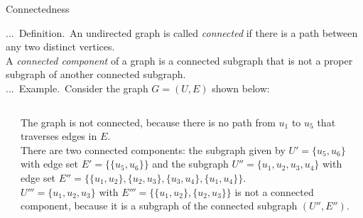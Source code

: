 \documentclass[smaller,hyperref={CJKbookmarks=true}]{beamer}
\newcounter{zhuo}[subsection]
\renewcommand{\thezhuo}{\thesection.\thesubsection.\arabic{zhuo}}
\newenvironment{DEFINITION}{\stepcounter{zhuo}\alert{\thezhuo.~Definition.\,}}{}
\newenvironment{EXAMPLE}{\stepcounter{zhuo}\alert{\!\thezhuo.~Example.\,}}{}
\begin{document}
\begin{frame}[t]{Connectedness}
\begin{spacing}{1.05}
\begin{DEFINITION}
An undirected graph is called \emph{connected} if there is a path
between any two distinct vertices.\\[5pt]
A \emph{connected component} of a graph is a connected subgraph that is not a
proper subgraph of another connected subgraph.\\[6pt]
\end{DEFINITION}
\begin{EXAMPLE}
Consider the graph $G=(U,E)$ shown below:\\[4pt]
\begin{columns}[onlytextwidth]
\begin{column}{0.25\textwidth}
\begin{center}
\end{center}
\end{column}
\begin{column}{0.75\textwidth}
The graph is not connected, because there is no path from $u_1$ to $u_5$ that traverses edges in $E$.\\[6pt]
There are two connected components: the subgraph given by $U'=\{u_5,u_6\}$ with edge set $E'=\{\{u_5,u_6\}\}$ and the subgraph $U''=\{u_1,u_2,u_3,u_4\}$ with edge set $E''=\{\{u_1,u_2\},\{u_2,u_3\},\{u_3,u_4\},\{u_1,u_4\}\}$.\\[5pt]
$U'''=\{u_1,u_2,u_3\}$ with $E'''=\{\{u_1,u_2\},\{u_2,u_3\}\}$ is not a connected component, because it is a subgraph of the connected subgraph $(U'',E'')$.
\end{column}
\end{columns}
\end{EXAMPLE}
\end{spacing}
\end{frame}
\end{document}
